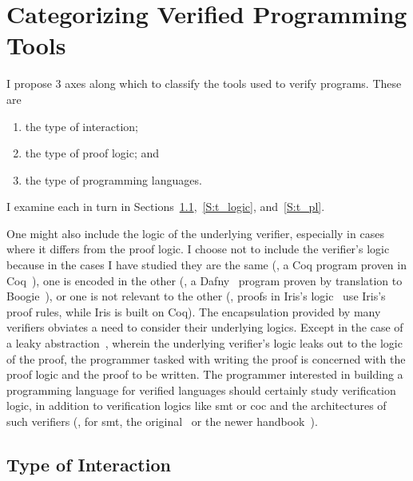 \section{Categorizing Verified Programming Tools}\label{S:categories}

I propose 3 axes along which to classify the tools used to verify programs.
These are
\begin{enumerate}
    \item the type of interaction;
    \item the type of proof logic; and
    \item the type of programming languages.
\end{enumerate}

I examine each in turn in Sections~\ref{S:t_interaction},~\ref{S:t_logic},
and~\ref{S:t_pl}.

One might also include the logic of the underlying verifier, especially in cases
where it differs from the proof logic. I choose not to include the verifier's
logic because in the cases I have studied they are the same (\eg, a Coq program
proven in Coq~\cite{Coq}), one is encoded in the other (\eg, a
Dafny~\cite{leino2010dafny} program proven by translation to
Boogie~\cite{Barnett_2006,leino2008this}), or one is not relevant to the other
(\eg, proofs in Iris's logic~\cite{Jung_2018b} use Iris's proof rules, while
Iris is built on Coq). The encapsulation provided by many verifiers obviates a
need to consider their underlying logics. Except in the case of a leaky
abstraction~\cite{Spolsky_2002}, wherein the underlying verifier's logic leaks
out to the logic of the proof, the programmer tasked with writing the proof is
concerned with the proof logic and the proof to be written. The
programmer interested in building a programming language for verified languages
should certainly study verification logic, in addition to verification logics
like \gls{smt} or \gls{coc} and the architectures of such verifiers (\eg, for
\gls{smt}, the original~\cite{Davis_1960,Davis_1962} or the newer
handbook~\cite{biere2009handbook}).

\subsection{Type of Interaction}\label{S:t_interaction}

